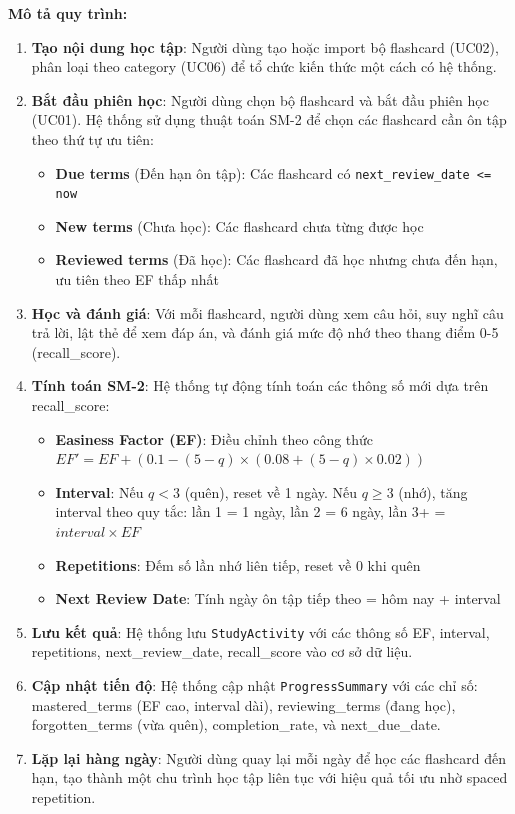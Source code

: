 \documentclass[../DoAn.tex]{subfiles}
\begin{document}
\textbf{Mô tả quy trình:}
\begin{enumerate}
    \item \textbf{Tạo nội dung học tập}: Người dùng tạo hoặc import bộ flashcard (UC02), phân loại theo category (UC06) để tổ chức kiến thức một cách có hệ thống.
    \item \textbf{Bắt đầu phiên học}: Người dùng chọn bộ flashcard và bắt đầu phiên học (UC01). Hệ thống sử dụng thuật toán SM-2 để chọn các flashcard cần ôn tập theo thứ tự ưu tiên:
    \begin{itemize}
        \item \textbf{Due terms} (Đến hạn ôn tập): Các flashcard có \texttt{next\_review\_date <= now}
        \item \textbf{New terms} (Chưa học): Các flashcard chưa từng được học
        \item \textbf{Reviewed terms} (Đã học): Các flashcard đã học nhưng chưa đến hạn, ưu tiên theo EF thấp nhất
    \end{itemize}
    \item \textbf{Học và đánh giá}: Với mỗi flashcard, người dùng xem câu hỏi, suy nghĩ câu trả lời, lật thẻ để xem đáp án, và đánh giá mức độ nhớ theo thang điểm 0-5 (recall\_score).
    \item \textbf{Tính toán SM-2}: Hệ thống tự động tính toán các thông số mới dựa trên recall\_score:
    \begin{itemize}
        \item \textbf{Easiness Factor (EF)}: Điều chỉnh theo công thức $EF' = EF + (0.1 - (5-q) \times (0.08 + (5-q) \times 0.02))$
        \item \textbf{Interval}: Nếu $q < 3$ (quên), reset về 1 ngày. Nếu $q \geq 3$ (nhớ), tăng interval theo quy tắc: lần 1 = 1 ngày, lần 2 = 6 ngày, lần 3+ = $interval \times EF$
        \item \textbf{Repetitions}: Đếm số lần nhớ liên tiếp, reset về 0 khi quên
        \item \textbf{Next Review Date}: Tính ngày ôn tập tiếp theo = hôm nay + interval
    \end{itemize}
    \item \textbf{Lưu kết quả}: Hệ thống lưu \texttt{StudyActivity} với các thông số EF, interval, repetitions, next\_review\_date, recall\_score vào cơ sở dữ liệu.
    \item \textbf{Cập nhật tiến độ}: Hệ thống cập nhật \texttt{ProgressSummary} với các chỉ số: mastered\_terms (EF cao, interval dài), reviewing\_terms (đang học), forgotten\_terms (vừa quên), completion\_rate, và next\_due\_date.
    \item \textbf{Lặp lại hàng ngày}: Người dùng quay lại mỗi ngày để học các flashcard đến hạn, tạo thành một chu trình học tập liên tục với hiệu quả tối ưu nhờ spaced repetition.
\end{enumerate}
\end{document}
